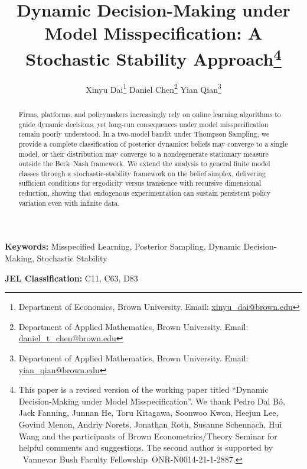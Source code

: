 \documentclass[12pt]{article}
\begin{document}
\title{Dynamic Decision-Making under Model Misspecification: A Stochastic Stability Approach\footnote{This paper is a revised version of the working paper titled ``Dynamic Decision-Making under Model Misspecification''. We thank Pedro Dal Bó, Jack Fanning, Junnan He, Toru Kitagawa, Soonwoo Kwon, Heejun Lee, Govind Menon, Andriy Norets, Jonathan Roth, Susanne Schennach, Hui Wang and the participants of Brown Econometrics/Theory Seminar for helpful comments and suggestions. The second author is supported by  Vannevar Bush Faculty Fellowship ONR-N0014-21-1-2887.}}
\author{Xinyu Dai\footnote{Department of Economics, Brown University. Email: \href{mailto:xinyu_dai@brown.edu}{xinyu\_dai@brown.edu}} \hspace{2cm} Daniel Chen\footnote{Department of Applied Mathematics, Brown University. Email: \href{mailto:daniel_t_chen@brown.edu}{daniel\_t\_chen@brown.edu}} \hspace{2cm} Yian Qian\footnote{Department of Applied Mathematics, Brown University. Email: \href{mailto:yian_qian@brown.edu}{yian\_qian@brown.edu}}}
\maketitle
\thispagestyle{empty}
\vspace{-1.5em}

\begin{abstract}\small
    Firms, platforms, and policymakers increasingly rely on online learning algorithms to guide dynamic decisions, yet long-run consequences under model misspecification remain poorly understood. In a two-model bandit under Thompson Sampling, we provide a complete classification of posterior dynamics: beliefs may converge to a single model, or their distribution may converge to a nondegenerate stationary measure outside the Berk--Nash framework. We extend the analysis to general finite model classes through a stochastic-stability framework on the belief simplex, delivering sufficient conditions for ergodicity versus transience with recursive dimensional reduction, showing that endogenous experimentation can sustain persistent policy variation even with infinite data.
\end{abstract}

\textbf{Keywords:} Misspecified Learning, Posterior Sampling, Dynamic Decision-Making, Stochastic Stability

\medskip

\noindent\textbf{JEL Classification:} C11, C63, D83
\end{document}
